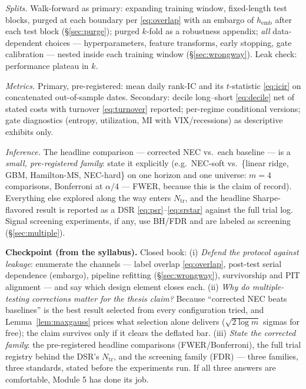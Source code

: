 \documentclass[11pt]{article}
\numberwithin{equation}{section}
\theoremstyle{plain}
\theoremstyle{definition}
\theoremstyle{remark}
\begin{document}
\emph{Splits.} Walk-forward as primary: expanding training window, fixed-length test blocks, purged at each boundary per \eqref{eq:overlap} with an embargo of $h_{\mathrm{emb}}$ after each test block (\S\ref{sec:purge}); purged $k$-fold as a robustness appendix; \emph{all} data-dependent choices --- hyperparameters, feature transforms, early stopping, gate calibration --- nested inside each training window (\S\ref{sec:wrongway}). Leak check: performance plateau in $k$.

\emph{Metrics.} Primary, pre-registered: mean daily rank-IC and its $t$-statistic \eqref{eq:icir} on concatenated out-of-sample dates. Secondary: decile long--short \eqref{eq:decile} net of stated costs with turnover \eqref{eq:turnover} reported; per-regime conditional versions; gate diagnostics (entropy, utilization, MI with VIX/recessions) as descriptive exhibits only.

\emph{Inference.} The headline comparison --- corrected NEC vs.\ each baseline --- is a \emph{small, pre-registered family}: state it explicitly (e.g.\ NEC-soft vs.\ \{linear ridge, GBM, Hamilton-MS, NEC-hard\} on one horizon and one universe: $m = 4$ comparisons, Bonferroni at $\alpha/4$ --- FWER, because this is the claim of record). Everything else explored along the way enters $N_{\mathrm{tr}}$, and the headline Sharpe-flavored result is reported as a DSR \eqref{eq:psr}--\eqref{eq:srstar} against the full trial log. Signal screening experiments, if any, use BH/FDR and are labeled as screening (\S\ref{sec:multiple}).

\medskip
\noindent\textbf{Checkpoint (from the syllabus).} Closed book: (i) \emph{Defend the protocol against leakage}: enumerate the channels --- label overlap \eqref{eq:overlap}, post-test serial dependence (embargo), pipeline refitting (\S\ref{sec:wrongway}), survivorship and PIT alignment --- and say which design element closes each. (ii) \emph{Why do multiple-testing corrections matter for the thesis claim?} Because ``corrected NEC beats baselines'' is the best result selected from every configuration tried, and Lemma~\ref{lem:maxgauss} prices what selection alone delivers ($\sqrt{2\log m}$ sigmas for free); the claim survives only if it clears the deflated bar. (iii) \emph{State the corrected family}: the pre-registered headline comparisons (FWER/Bonferroni), the full trial registry behind the DSR's $N_{\mathrm{tr}}$, and the screening family (FDR) --- three families, three standards, stated before the experiments run. If all three answers are comfortable, Module 5 has done its job.
\end{document}
